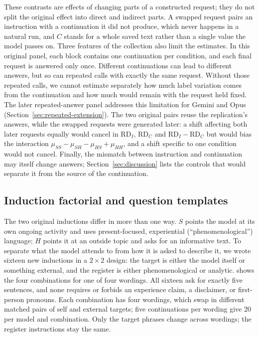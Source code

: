 \documentclass[11pt]{article}
\newcommand{\rd}{\mathrm{RD}}
\begin{document}
These contrasts are effects of changing parts of a constructed request; they
do not split the original effect into direct and indirect parts. A swapped
request pairs an instruction with a continuation it did not produce, which
never happens in a natural run, and $C$ stands for a whole saved text rather
than a single value the model passes on. Three features of the collection
also limit the estimates. In this original panel, each block contains one
continuation per condition, and each final request is answered only once.
Different continuations can lead to different answers, but so can repeated
calls with exactly the same request. Without those repeated calls, we cannot
estimate separately how much label variation comes from the continuation
and how much would remain with the request held fixed. The later
repeated-answer panel addresses this limitation for Gemini and Opus
(Section~\ref{sec:repeated-extension}). The two original pairs reuse the
replication's answers, while the swapped requests were generated later: a
shift affecting both later requests equally would cancel in $\rd_I$, $\rd_C$
and $\rd_I-\rd_C$ but would bias the interaction
$\mu_{SS}-\mu_{SH}-\mu_{HS}+\mu_{HH}$, and a shift specific to one condition
would not cancel. Finally, the mismatch between instruction and continuation
may itself change answers; Section~\ref{sec:discussion} lists the controls
that would separate it from the source of the continuation.

\subsection{Induction factorial and question templates}
\label{sec:factorial-design}

The two original inductions differ in more than one way. $S$ points the model
at its own ongoing activity and uses present-focused, experiential
(``phenomenological'') language; $H$ points it at an outside topic and asks
for an informative text. To separate what the model attends to from how it is
asked to describe it, we wrote sixteen new inductions in a $2\times2$ design:
the target is either the model itself or something external, and the register
is either phenomenological or analytic.  shows
the four combinations for one of four wordings. All sixteen ask for exactly
five sentences, and none requires or forbids an experience claim, a
disclaimer, or first-person pronouns. Each combination has four wordings,
which swap in different matched pairs of self and external targets; five
continuations per wording give 20 per model and combination. Only the target
phrases change across wordings; the register instructions stay the same.
\end{document}
